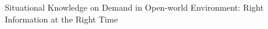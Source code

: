 \noindent {} Situational Knowledge on Demand in Open-world Environment: Right Information at the Right Time





\newpage